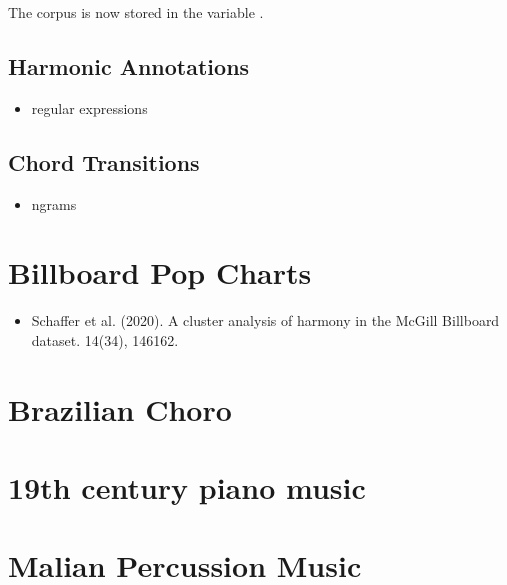 \documentclass[letterpaper,10pt,english]{sphinxmanual}
\begin{document}
The corpus is now stored in the variable .


\section{Harmonic Annotations}
\label{\detokenize{beethoven_harmony:harmonic-annotations}}\begin{itemize}
\item {} 
regular expressions

\end{itemize}


\section{Chord Transitions}
\label{\detokenize{beethoven_harmony:chord-transitions}}\begin{itemize}
\item {} 
n\sphinxhyphen{}grams

\end{itemize}


\chapter{Billboard Pop Charts}
\label{\detokenize{billboard:billboard-pop-charts}}\label{\detokenize{billboard::doc}}\begin{itemize}
\item {} 
Schaffer et al. (2020). A cluster analysis of harmony in the McGill Billboard dataset.  14(3\textendash{}4), 146\textendash{}162. 

\end{itemize}


\chapter{Brazilian Choro}
\label{\detokenize{choro:brazilian-choro}}\label{\detokenize{choro::doc}}

\chapter{19th century piano music}
\label{\detokenize{piano:th-century-piano-music}}\label{\detokenize{piano::doc}}

\chapter{Malian Percussion Music}
\label{\detokenize{mali_percussion:malian-percussion-music}}\label{\detokenize{mali_percussion::doc}}
\end{document}
